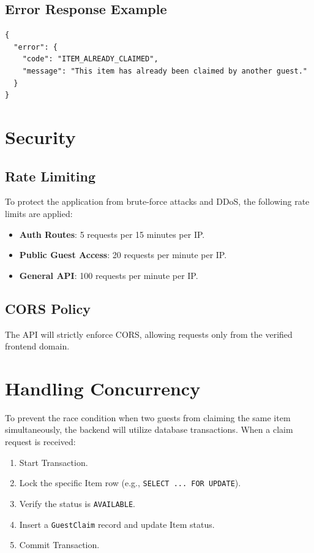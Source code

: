 \subsection{Error Response Example}
\begin{verbatim}
{
  "error": {
    "code": "ITEM_ALREADY_CLAIMED",
    "message": "This item has already been claimed by another guest."
  }
}
\end{verbatim}

\section{Security}
\subsection{Rate Limiting}
To protect the application from brute-force attacks and DDoS, the following rate limits are applied:
\begin{itemize}
    \item \textbf{Auth Routes}: 5 requests per 15 minutes per IP.
    \item \textbf{Public Guest Access}: 20 requests per minute per IP.
    \item \textbf{General API}: 100 requests per minute per IP.
\end{itemize}

\subsection{CORS Policy}
The API will strictly enforce CORS, allowing requests only from the verified frontend domain.

\section{Handling Concurrency}
To prevent the race condition when two guests from claiming the same item simultaneously, the backend will utilize database transactions. When a claim request is received:
\begin{enumerate}
    \item Start Transaction.
    \item Lock the specific Item row (e.g., \texttt{SELECT ... FOR UPDATE}).
    \item Verify the status is \texttt{AVAILABLE}.
    \item Insert a \texttt{GuestClaim} record and update Item status.
    \item Commit Transaction.
\end{enumerate}

